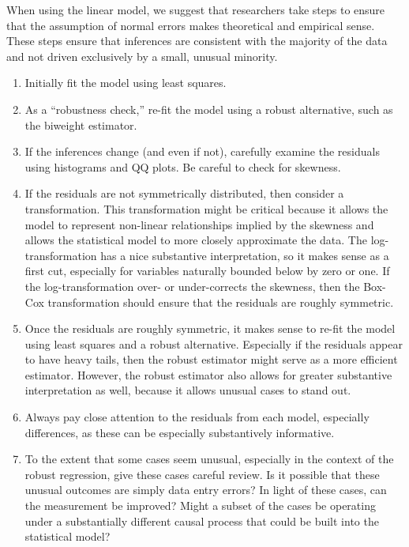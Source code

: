 \documentclass[12pt]{article}
\begin{document}
When using the linear model, we suggest that researchers take steps to ensure that the assumption of normal errors makes theoretical and empirical sense. 
These steps ensure that inferences are consistent with the majority of the data and not driven exclusively by a small, unusual minority. 
\begin{enumerate}
	\item Initially fit the model using least squares. 
	\item As a ``robustness check,'' re-fit the model using a robust alternative, such as the biweight estimator. 
	\item If the inferences change (and even if not), carefully examine the residuals using histograms and QQ plots. Be careful to check for skewness.
	\item If the residuals are not symmetrically distributed, then consider a transformation. 
	This transformation might be critical because it allows the model to represent non-linear relationships implied by the skewness and allows the statistical model to more closely approximate the data. 
	The log-transformation has a nice substantive interpretation, so it makes sense as a first cut, especially for variables naturally bounded below by zero or one. 
	If the log-transformation over- or under-corrects the skewness, then the Box-Cox transformation should ensure that the residuals are roughly symmetric.
	\item Once the residuals are roughly symmetric, it makes sense to re-fit the model using least squares and a robust alternative. 
	Especially if the residuals appear to have heavy tails, then the robust estimator might serve as a more efficient estimator. 
	However, the robust estimator also allows for greater substantive interpretation as well, because it allows unusual cases to stand out.
	\item Always pay close attention to the residuals from each model, especially differences, as these can be especially substantively informative.
	\item To the extent that some cases seem unusual, especially in the context of the robust regression, give these cases careful review. 
	Is it possible that these unusual outcomes are simply data entry errors? 
	In light of these cases, can the measurement be improved? 
	Might a subset of the cases be operating under a substantially different causal process that could be built into the statistical model? 
\end{enumerate}
\end{document}
